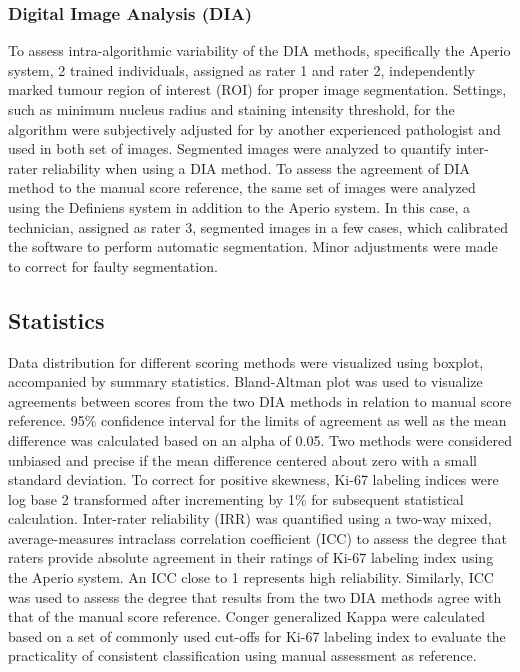 \documentclass[final,3p,times]{elsarticle}
\begin{document}
\subsubsection*{Digital Image Analysis (DIA)}
To assess intra-algorithmic variability of the DIA methods, specifically the Aperio system, 2 trained individuals, assigned as rater 1 and rater 2, independently marked tumour region of interest (ROI) for proper image segmentation. Settings, such as minimum nucleus radius and staining intensity threshold, for the algorithm were subjectively adjusted for by another experienced pathologist and used in both set of images. Segmented images were analyzed to quantify inter-rater reliability when using a DIA method. To assess the agreement of DIA method to the manual score reference, the same set of images were analyzed using the Definiens system in addition to the Aperio system. In this case, a technician, assigned as rater 3, segmented images in a few cases, which calibrated the software to perform automatic segmentation. Minor adjustments were made to correct for faulty segmentation.

\subsection*{Statistics}
Data distribution for different scoring methods were visualized using boxplot, accompanied by summary statistics. Bland-Altman plot was used to visualize agreements between scores from the two DIA methods in relation to manual score reference. \cite{Bland1986} 95\% confidence interval for the limits of agreement as well as the mean difference was calculated based on an alpha of 0.05. Two methods were considered unbiased and precise if the mean difference centered about zero with a small standard deviation. \cite{Hanneman2008} To correct for positive skewness, Ki-67 labeling indices were log base 2 transformed after incrementing by 1\% for subsequent statistical calculation. Inter-rater reliability (IRR) was quantified using a two-way mixed, average-measures intraclass correlation coefficient (ICC) to assess the degree that raters provide absolute agreement in their ratings of Ki-67 labeling index using the Aperio system. \cite{Shrout1979} An ICC close to 1 represents high reliability. Similarly, ICC was used to assess the degree that results from the two DIA methods agree with that of the manual score reference. Conger generalized Kappa were calculated based on a set of commonly used cut-offs for Ki-67 labeling index to evaluate the practicality of consistent classification using manual assessment as reference. \cite{Conger1980}
\end{document}
